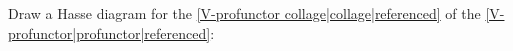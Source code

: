 
Draw a Hasse diagram for the \ref{V-profunctor collage|collage|referenced} of the \ref{V-profunctor|profunctor|referenced}: